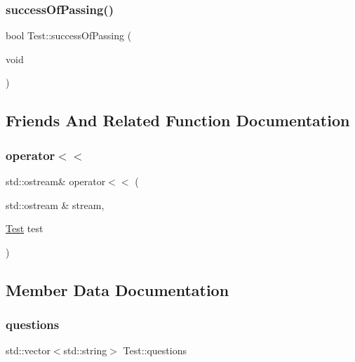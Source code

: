 \hypertarget{class_test_aafa54c39027462096d9c65c84bf9e976}{}\label{class_test_aafa54c39027462096d9c65c84bf9e976} 
\subsubsection{\texorpdfstring{success\+Of\+Passing()}{successOfPassing()}}
{\footnotesize\ttfamily bool Test\+::success\+Of\+Passing (\begin{DoxyParamCaption}\item[{void}]{ }\end{DoxyParamCaption})\hspace{0.3cm}{\ttfamily [inline]}}



\subsection{Friends And Related Function Documentation}
\hypertarget{class_test_ad6b01dce65f182b44e1dbb82d80d9dff}{}\label{class_test_ad6b01dce65f182b44e1dbb82d80d9dff} 
\subsubsection{\texorpdfstring{operator$<$$<$}{operator<<}}
{\footnotesize\ttfamily std\+::ostream\& operator$<$$<$ (\begin{DoxyParamCaption}\item[{std\+::ostream \&}]{stream,  }\item[{\hyperlink{class_test}{Test}}]{test }\end{DoxyParamCaption})\hspace{0.3cm}{\ttfamily [friend]}}



\subsection{Member Data Documentation}
\hypertarget{class_test_a44f8c50d1aa570514abcfcd0663f3df2}{}\label{class_test_a44f8c50d1aa570514abcfcd0663f3df2} 
\subsubsection{\texorpdfstring{questions}{questions}}
{\footnotesize\ttfamily std\+::vector$<$std\+::string$>$ Test\+::questions\hspace{0.3cm}{\ttfamily [private]}}


